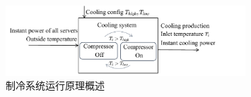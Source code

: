 \begin{figure}[!htbp]
  \centering
  \includegraphics[width=0.8\textwidth]{figures/chapter4/cooling_workloop.pdf}
\caption{制冷系统运行原理概述}
\label{fig:cooling_workloop} 
\end{figure}


